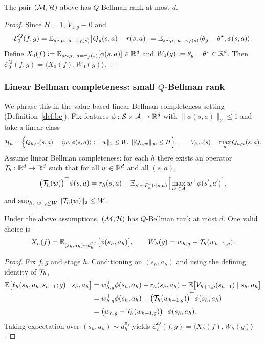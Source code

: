 \begin{proposition}
\label{prop:br_ctx_lin_bandit}
The pair $(\mathcal{M},\mathcal{H})$ above has $Q$-Bellman rank at most $d$.
\end{proposition}

\begin{proof}
Since $H=1$, $V_{1,g}\equiv 0$ and
\[
\mathcal{E}_0^{Q}(f,g)
=
\mathbb{E}_{s\sim\mu,\ a=\pi_f(s)}\big[Q_g(s,a)-r(s,a)\big]
=
\mathbb{E}_{s\sim\mu,\ a=\pi_f(s)}\langle \theta_g-\theta^\star,\phi(s,a)\rangle.
\]
Define $X_0(f):=\E_{s\sim\mu,\ a=\pi_f(s)}[\phi(s,a)]\in\R^d$ and $W_0(g):=\theta_g-\theta^\star\in\mathbb{R}^d$.
Then $\mathcal{E}_0^{Q}(f,g)=\langle X_0(f),W_0(g)\rangle$.
\end{proof}

\subsubsection{Linear Bellman completeness: small $Q$-Bellman rank}

We phrase this in the value-based linear Bellman completeness setting (Definition~\ref{def:bc}).
Fix features $\phi:\mathcal{S}\times\mathcal{A}\to\mathbb{R}^d$ with $\|\phi(s,a)\|_2\le 1$ and take a linear class
\[
\mathcal{H}_h=\Big\{Q_{h,w}(s,a)=\langle w,\phi(s,a)\rangle:\ \|w\|_2\le W,\ \|Q_{h,w}\|_\infty\le H\Big\},
\qquad
V_{h,w}(s)=\max_{a}Q_{h,w}(s,a).
\]
Assume linear Bellman completeness: for each $h$ there exists an operator $\mathcal{T}_h:\mathbb{R}^d\to\mathbb{R}^d$ such that
for all $w\in\mathbb{R}^d$ and all $(s,a)$,
\[
\big(\mathcal{T}_h(w)\big)^\top\phi(s,a)
=
r_h(s,a)
+
\mathbb{E}_{s'\sim P_h^\star(\cdot\mid s,a)}\Big[\max_{a'\in\mathcal{A}} w^\top\phi(s',a')\Big],
\]
and $\sup_{h,\|w\|_2\le W}\|\mathcal{T}_h(w)\|_2\le W$.

\begin{proposition}
\label{prop:br_linear_bc}
Under the above assumptions, $(\mathcal{M},\mathcal{H})$ has $Q$-Bellman rank at most $d$.
One valid choice is
\[
X_h(f)=\mathbb{E}_{(s_h,a_h)\sim d_h^{\pi_f}}\big[\phi(s_h,a_h)\big],
\qquad
W_h(g)=w_{h,g}-\mathcal{T}_h(w_{h+1,g}).
\]
\end{proposition}

\begin{proof}
Fix $f,g$ and stage $h$. Conditioning on $(s_h,a_h)$ and using the defining identity of $\mathcal{T}_h$,
\begin{align*}
\mathbb{E}\big[\ell_h(s_h,a_h,s_{h+1};g)\mid s_h,a_h\big]
&=
w_{h,g}^\top\phi(s_h,a_h)-r_h(s_h,a_h)-\mathbb{E}\big[V_{h+1,g}(s_{h+1})\mid s_h,a_h\big]\\
&=
w_{h,g}^\top\phi(s_h,a_h)-\big(\mathcal{T}_h(w_{h+1,g})\big)^\top\phi(s_h,a_h)\\
&=
\big(w_{h,g}-\mathcal{T}_h(w_{h+1,g})\big)^\top\phi(s_h,a_h).
\end{align*}
Taking expectation over $(s_h,a_h)\sim d_h^{\pi_f}$ yields
$\mathcal{E}_h^Q(f,g)=\langle X_h(f),W_h(g)\rangle$.
\end{proof}

